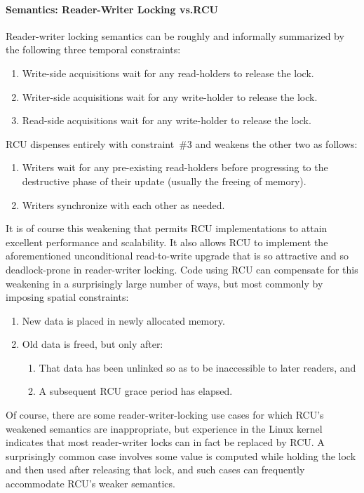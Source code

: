 \paragraph{Semantics:
		      Reader-Writer Locking vs.\@ RCU}

Reader-writer locking semantics can be roughly and informally summarized
by the following three temporal constraints:

\begin{enumerate}
\item	Write-side acquisitions wait for any read-holders to release
	the lock.
\item	Writer-side acquisitions wait for any write-holder to release
	the lock.
\item	Read-side acquisitions wait for any write-holder to release
	the lock.
\end{enumerate}

RCU dispenses entirely with constraint~\#3 and weakens the other two
as follows:

\begin{enumerate}
\item	Writers wait for any pre-existing read-holders before progressing
	to the destructive phase of their update (usually the freeing of
	memory).
\item	Writers synchronize with each other as needed.
\end{enumerate}

It is of course this weakening that permits RCU implementations to attain
excellent performance and scalability.
It also allows RCU to implement the aforementioned unconditional
read-to-write upgrade that is so attractive and so deadlock-prone in
reader-writer locking.
Code using RCU can compensate for this weakening in a surprisingly large
number of ways, but most commonly by imposing spatial constraints:

\begin{enumerate}
\item	New data is placed in newly allocated memory.
\item	Old data is freed, but only after:
	\begin{enumerate}
	\item	That data has been unlinked so as to be inaccessible
		to later readers, and
	\item	A subsequent RCU grace period has elapsed.
	\end{enumerate}
\end{enumerate}

Of course, there are some reader-writer-locking use cases for which RCU's
weakened semantics are inappropriate, but experience in the Linux kernel
indicates that most reader-writer locks can in fact be replaced by RCU\@.
A surprisingly common case involves some value is computed while holding
the lock and then used after releasing that lock, and such cases can
frequently accommodate RCU's weaker semantics.

